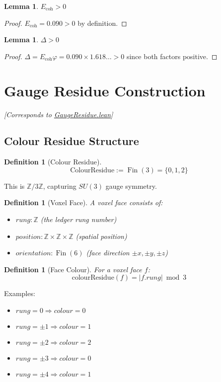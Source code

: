 \documentclass[11pt]{article}
\numberwithin{equation}{section}
\newtheorem{lemma}[theorem]{Lemma}
\newtheorem{definition}[theorem]{Definition}
\theoremstyle{remark}
\newcommand{\Ecoh}{E_{\text{coh}}}
\newcommand{\massGap}{\Delta}
\newcommand{\Z}{\mathbb{Z}}
\DeclareMathOperator{\Fin}{Fin}
\begin{document}
\begin{lemma}
$\Ecoh > 0$
\end{lemma}
\begin{proof}
$\Ecoh = 0.090 > 0$ by definition.
\end{proof}

\begin{lemma}
$\massGap > 0$
\end{lemma}
\begin{proof}
$\massGap = \Ecoh \varphi = 0.090 \times 1.618\ldots > 0$ since both factors positive.
\end{proof}

\section{Gauge Residue Construction}
\textit{[Corresponds to \href{https://github.com/jonwashburn/Yang-Mills-Lean/blob/main/YangMillsProof/GaugeResidue.lean}{GaugeResidue.lean}]}

\subsection{Colour Residue Structure}

\begin{definition}[Colour Residue]
\[\text{ColourResidue} := \Fin(3) = \{0, 1, 2\}\]
\end{definition}

This is $\Z/3\Z$, capturing $SU(3)$ gauge symmetry.

\begin{definition}[Voxel Face]
A voxel face consists of:
\begin{itemize}
\item $rung : \Z$ (the ledger rung number)
\item $position : \Z \times \Z \times \Z$ (spatial position)
\item $orientation : \Fin(6)$ (face direction $\pm x, \pm y, \pm z$)
\end{itemize}
\end{definition}

\begin{definition}[Face Colour]
For a voxel face $f$:
\[\text{colourResidue}(f) = |f.rung| \bmod 3\]
\end{definition}

Examples:
\begin{itemize}
\item $rung = 0 \Rightarrow colour = 0$
\item $rung = \pm 1 \Rightarrow colour = 1$
\item $rung = \pm 2 \Rightarrow colour = 2$
\item $rung = \pm 3 \Rightarrow colour = 0$
\item $rung = \pm 4 \Rightarrow colour = 1$
\end{itemize}
\end{document}
